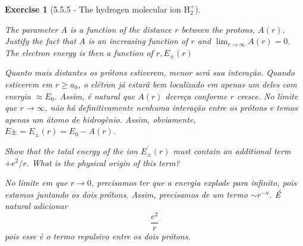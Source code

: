 \documentclass[12pt]{article}
\def\be{\begin{equation}}
\def\ee{\end{equation}}
\def\eea{\end{eqnarray*}}
\def\f{\frac}
\newtheorem{exercise}{Exercise}
\begin{document}
\begin{exercise}[5.5.5 - The hydrogen molecular ion $\mathrm{H}_{2}^{+}$]
\begin{exercises}
		
			\item The parameter $A$ is a function of the distance $r$ between the protons, $A(r)$. Justify the fact that $A$ is an increasing function of $r$ and $\lim _{r \rightarrow \infty} A(r)=0$. The electron energy is then a function of $r, E_{ \pm}(r)$
			\begin{multianswer}
				Quanto mais distantes os prótons estiverem, menor será sua interação. Quando estiverem em $r\geq a_0$, o elétron já estará bem localizado em apenas um deles com energia $\approx E_0$. Assim, é natural que $A(r)$ decreça conforme $r$ cresce. No limite que $r\to\infty$, não há definitivamente nenhuma interação entre os prótons e temos apenas um átomo de hidrogênio. Assim, obviamente, $E\pm=E_\pm(r)=E_0-A(r)$. 
			\end{multianswer}
			
			\item Show that the total energy of the ion $E_{ \pm}^{\prime}(r)$ must contain an additional term $+e^{2} / r$. What is the physical origin of this term?
			\begin{multianswer}
				No limite em que $r\to0$, precisamos ter que a energia explode para infinito, pois estamos juntando os dois prótons. Assim, precisamos de um termo $\sim r^{-n}$. É natural adicionar
				\be
					\f{e^2}{r}
				\ee
				pois esse é o termo repulsivo entre os dois prótons. 
			\end{multianswer}
			

\end{exercises}
\end{exercise}
\end{document}
